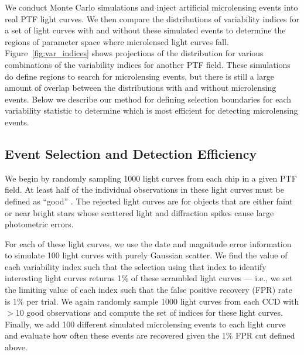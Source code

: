 \documentclass{emulateapj}
\begin{document}
We conduct Monte Carlo simulations and inject artificial microlensing events into real PTF light curves. We then compare the distributions of variability indices for a set of light curves with and without these simulated events to determine the regions of parameter space where microlensed light curves fall. Figure~\ref{fig:var_indices} shows projections of the distribution for various combinations of the variability indices for another PTF field. These simulations do define regions to search for microlensing events, but there is still a large amount of overlap between the distributions with and without microlensing events. Below we describe our method for defining selection boundaries for each variability statistic to determine which is most efficient for detecting microlensing events.

\subsection{Event Selection and Detection Efficiency} \label{sec:detection_eff}
We begin by randomly sampling 1000 light curves from each chip in a given PTF field. At least half of the individual observations in these light curves must be defined as ``good'' \citep[see description of processing pipeline in][]{nick2009}. The rejected light curves are for objects that are either faint or near bright stars whose scattered light and diffraction spikes cause large photometric errors. 

For each of these light curves, we use the date and magnitude error information to simulate 100 light curves with purely Gaussian scatter. We find the value of each variability index such that the selection using that index to identify interesting light curves returns 1\% of these scrambled light curves --- i.e., we set the limiting value of each index such that the false positive recovery (FPR) rate is 1\% per trial. We again randomly sample 1000 light curves from each CCD with $>$10 good observations and compute the set of indices for these light curves. Finally, we add 100 different simulated microlensing events to each light curve and evaluate how often these events are recovered given the 1\% FPR cut defined above. 
\end{document}
